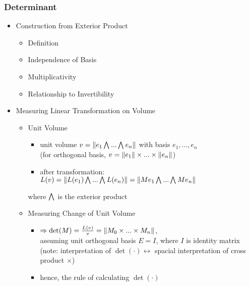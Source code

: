 \subsubsection{Determinant}
\begin{itemize}
\item Construction from Exterior Product
	\begin{itemize}
	\item Definition
	\item Independence of Basis
	\item Multiplicativity
	\item Relationship to Invertibility
	\end{itemize}

\item Measuring Linear Transformation on Volume
	\begin{itemize}
	\item Unit Volume
		\begin{itemize}
		\item unit volume $v=\norm{e_1 \extp ...\extp e_n}$ with basis $e_1,...,e_n$ \\
		(for orthogonal basis, $v=\lVert e_1\rVert\times...\times\lVert e_n\rVert$)
		\item after transformation: $L(v) = \norm{L(e_1)\extp...\extp L(e_n)} = \norm{Me_1\extp...\extp Me_n}$
		\end{itemize}
		where $\extp$ is the exterior product
	\item Measuring Change of Unit Volume
		\begin{itemize}
		\item $\Rightarrow \det(M) = \frac {L(v)}{v} = \lVert M_0\times...\times M_n\rVert$, \\
		assuming unit orthogonal basis $E=I$, where $I$ is identity matrix \\
		(note: interpretation of $\det(\cdot) \leftrightarrow$ spacial interpretation of cross product $\times$)
		\item hence, the rule of calculating $\det(\cdot)$ \\
		\end{itemize}
	\end{itemize}
	

\end{itemize}
